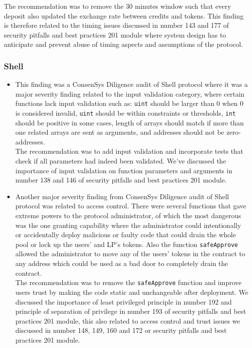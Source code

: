 The recommendation was to remove the 30 minutes window such that every
deposit also updated the exchange rate between credits and tokens. This
finding is therefore related to the timing issues discussed in number
143 and 177 of security pitfalls and best practices 201 module where
system design has to anticipate and prevent abuse of timing aspects and
assumptions of the protocol.

\subsubsection{Shell}\label{shell}

\begin{itemize}
\item
  This finding was a ConsenSys Diligence audit of Shell protocol where
  it was a major severity finding related to the input validation
  category, where certain functions lack input validation such as:
  \texttt{uint} should be larger than 0 when 0 is considered invalid,
  \texttt{uint} should be within constraints or thresholds, \texttt{int}
  should be positive in some cases, length of arrays should match if
  more than one related arrays are sent as arguments, and addresses
  should not be zero-addresses.\\

  The recommendation was to add input validation and incorporate tests
  that check if all parameters had indeed been validated. We've
  discussed the importance of input validation on function parameters
  and arguments in number 138 and 146 of security pitfalls and best
  practices 201 module.
\item
  Another major severity finding from ConsenSys Diligence audit of Shell
  protocol was related to access control. There were several functions
  that gave extreme powers to the protocol administrator, of which the
  most dangerous was the one granting capability where the administrator
  could intentionally or accidentally deploy malicious or faulty code
  that could drain the whole pool or lock up the users' and LP's tokens.
  Also the function \texttt{safeApprove} allowed the administrator to
  move any of the users' tokens in the contract to any address which
  could be used as a bad door to completely drain the contract.\\

  The recommendation was to remove the \texttt{safeApprove} function and
  improve users trust by making the code static and unchangeable after
  deployment. We discussed the importance of least privileged principle
  in number 192 and principle of separation of privilege in number 193
  of security pitfalls and best practices 201 module, this also related
  to access control and trust issues we discussed in number 148, 149,
  160 and 172 or security pitfalls and best practices 201 module.
\end{itemize}

